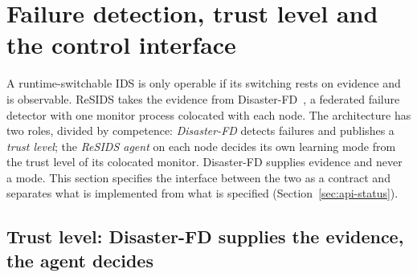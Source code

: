 %
%
%

\section{Failure detection, trust level and the control interface}
\label{sec:api}

A runtime-switchable IDS is only operable if its switching rests on evidence and is
observable. ReSIDS takes the evidence from Disaster-FD~\cite{disasterfd2025}, a federated
failure detector with one monitor process colocated with each node. The architecture has
two roles, divided by competence: \emph{Disaster-FD} detects failures and publishes a
\emph{trust level}; the \emph{ReSIDS agent} on each node decides its own learning mode from
the trust level of its colocated monitor. Disaster-FD supplies evidence and never a mode.
This section specifies the interface between the two as a contract and separates what is
implemented from what is specified (Section~\ref{sec:api-status}).

\subsection{Trust level: Disaster-FD supplies the evidence, the agent decides}
\label{sec:api-authority}

